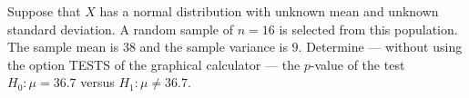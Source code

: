 Suppose that $X$ has a normal distribution with unknown mean and unknown standard deviation.
A random sample of $n = 16$ is selected from this population.
The sample mean is $38$ and the sample variance is $9$.
Determine --- without using the option TESTS of the graphical calculator --- the $p$-value of the test $H_0: \mu = 36.7$ versus $H_1: \mu \neq 36.7$.